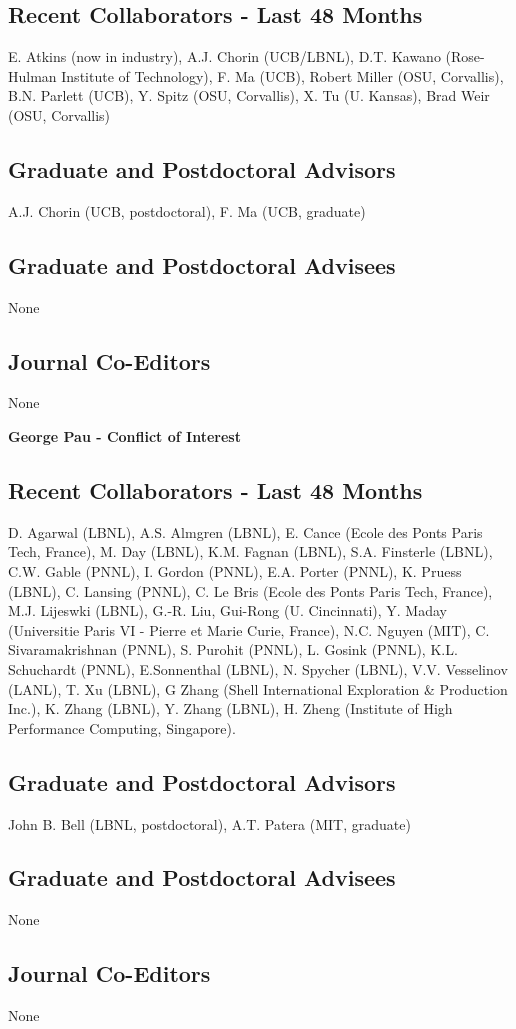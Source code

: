 \documentclass[11pt]{article}
\begin{document}
\subsection*{Recent Collaborators - Last 48 Months}
E. Atkins (now in industry), A.J. Chorin (UCB/LBNL), D.T. Kawano (Rose-Hulman Institute of Technology), F. Ma (UCB), Robert Miller (OSU, Corvallis), B.N. Parlett (UCB), Y. Spitz (OSU, Corvallis), X. Tu (U. Kansas), Brad Weir (OSU, Corvallis)

\subsection*{Graduate and Postdoctoral Advisors}
A.J. Chorin (UCB, postdoctoral), F. Ma (UCB, graduate)

\subsection*{Graduate and Postdoctoral Advisees} 
None

\subsection*{Journal Co-Editors} None



\newpage
\begin{center}
{\Large{\textbf{George Pau - Conflict of Interest}}}
\end{center}

\subsection*{Recent Collaborators - Last 48 Months}
D. Agarwal (LBNL), A.S. Almgren (LBNL), E. Cance (Ecole des Ponts Paris Tech, France), M. Day (LBNL), K.M. Fagnan (LBNL), S.A. Finsterle (LBNL), C.W. Gable (PNNL), I. Gordon (PNNL), E.A. Porter (PNNL), K. Pruess (LBNL), C. Lansing (PNNL), C. Le Bris (Ecole des Ponts Paris Tech, France), M.J. Lijeswki (LBNL), G.-R. Liu, Gui-Rong (U. Cincinnati), Y. Maday (Universitie Paris VI - Pierre et Marie Curie, France),  N.C. Nguyen (MIT), C. Sivaramakrishnan (PNNL), S. Purohit (PNNL), L. Gosink (PNNL), K.L. Schuchardt (PNNL), E.Sonnenthal (LBNL), N. Spycher (LBNL), V.V. Vesselinov (LANL), T. Xu (LBNL), G Zhang (Shell International Exploration \& Production Inc.), K. Zhang (LBNL), Y. Zhang (LBNL), H. Zheng (Institute of High Performance Computing, Singapore).

\subsection*{Graduate and Postdoctoral Advisors}
John B. Bell (LBNL, postdoctoral), A.T. Patera (MIT, graduate)

\subsection*{Graduate and Postdoctoral Advisees} 
None

\subsection*{Journal Co-Editors} None
\end{document}
